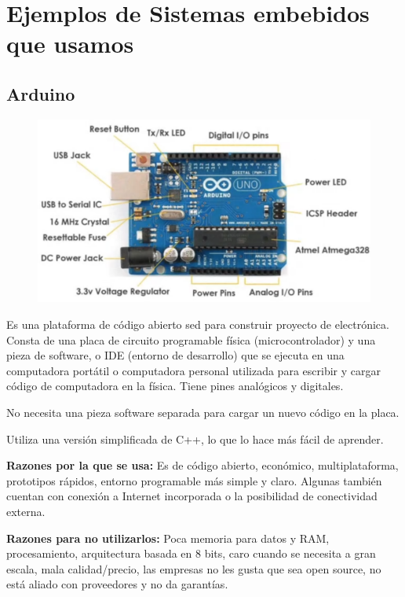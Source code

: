 \documentclass[12pt, twoside, openright]{report} %
\begin{document}
\section{Ejemplos de Sistemas embebidos que usamos}
\subsection{Arduino}

\begin{figure}[H]
	{\includegraphics[scale=.5]{2021-03-19 17_31_12-DSO Elementos Sistema embebido.mkv.png}}
\end{figure}


Es una plataforma de código abierto sed para construir proyecto de electrónica.	Consta de una placa de circuito programable física (microcontrolador) y una pieza de software, o IDE (entorno de desarrollo) que se ejecuta en una computadora portátil o computadora personal utilizada para escribir y cargar código de computadora en la física. Tiene pines analógicos y digitales.

No necesita una pieza software separada para cargar un nuevo código en la placa.

Utiliza una versión simplificada de C++, lo que lo hace más fácil de aprender.

\textbf{Razones por la que se usa:} Es de código abierto, económico, multiplataforma, prototipos rápidos, entorno programable más simple y claro. Algunas también cuentan con conexión a Internet incorporada o la posibilidad de conectividad externa.

\textbf{Razones para no utilizarlos:} Poca memoria para datos y RAM, procesamiento, arquitectura basada en 8 bits, caro cuando se necesita a gran escala, mala calidad/precio, las empresas no les gusta que sea open source, no está aliado con proveedores y no da garantías.
\end{document}

